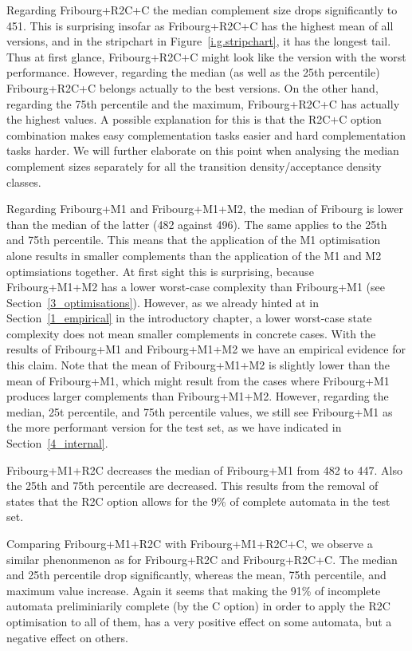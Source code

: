 Regarding Fribourg+R2C+C the median complement size drops significantly to 451. This is surprising insofar as Fribourg+R2C+C has the highest mean of all versions, and in the stripchart in Figure~\ref{i.g.stripchart}, it has the longest tail. Thus at first glance, Fribourg+R2C+C might look like the version with the worst performance. However, regarding the median (as well as the 25th percentile) Fribourg+R2C+C belongs actually to the best versions. On the other hand, regarding the 75th percentile and the maximum, Fribourg+R2C+C has actually the highest values. A possible explanation for this is that the R2C+C option combination makes easy complementation tasks easier and hard complementation tasks harder. We will further elaborate on this point when analysing the median complement sizes separately for all the transition density/acceptance density classes. 

Regarding Fribourg+M1 and Fribourg+M1+M2, the median of Fribourg is lower than the median of the latter (482 against 496). The same applies to the 25th and 75th percentile. This means that the application of the M1 optimisation alone results in smaller complements than the application of the M1 and M2 optimsiations together. At first sight this is surprising, because Fribourg+M1+M2 has a lower worst-case complexity than Fribourg+M1 (see Section~\ref{3_optimisations}). However, as we already hinted at in Section~\ref{1_empirical} in the introductory chapter, a lower worst-case state complexity does not mean smaller complements in concrete cases. With the results of Fribourg+M1 and Fribourg+M1+M2 we have an empirical evidence for this claim. Note that the mean of Fribourg+M1+M2 is slightly lower than the mean of Fribourg+M1, which might result from the cases where Fribourg+M1 produces larger complements than Fribourg+M1+M2. However, regarding the median, 25t percentile, and 75th percentile values, we still see Fribourg+M1 as the more performant version for the \goal{} test set, as we have indicated in Section~\ref{4_internal}.

Fribourg+M1+R2C decreases the median of Fribourg+M1 from 482 to 447. Also the 25th and 75th percentile are decreased. This results from the removal of states that the R2C option allows for the 9\% of complete automata in the \goal{} test set.

Comparing Fribourg+M1+R2C with Fribourg+M1+R2C+C, we observe a similar phenonmenon as for Fribourg+R2C and Fribourg+R2C+C. The median and 25th percentile drop significantly, whereas the mean, 75th percentile, and maximum value increase. Again it seems that making the 91\% of incomplete automata preliminiarily complete (by the C option) in order to apply the R2C optimisation to all of them, has a very positive effect on some automata, but a negative effect on others.


